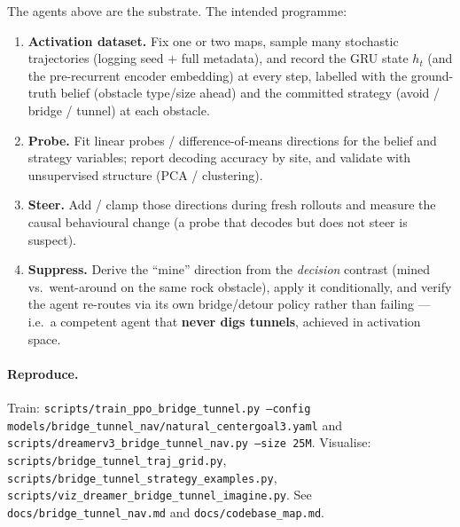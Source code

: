 \documentclass[11pt]{article}
\newcommand{\code}[1]{\texttt{#1}}
\begin{document}
The agents above are the substrate. The intended programme:
\begin{enumerate}[leftmargin=1.4em]
\item \textbf{Activation dataset.} Fix one or two maps, sample many stochastic
trajectories (logging seed + full metadata), and record the GRU state $h_t$ (and
the pre-recurrent encoder embedding) at every step, labelled with the
ground-truth belief (obstacle type/size ahead) and the committed strategy
(avoid / bridge / tunnel) at each obstacle.
\item \textbf{Probe.} Fit linear probes / difference-of-means directions for the
belief and strategy variables; report decoding accuracy by site, and validate with
unsupervised structure (PCA / clustering).
\item \textbf{Steer.} Add / clamp those directions during fresh rollouts and
measure the causal behavioural change (a probe that decodes but does not steer is
suspect).
\item \textbf{Suppress.} Derive the ``mine'' direction from the \emph{decision}
contrast (mined vs.\ went-around on the same rock obstacle), apply it conditionally,
and verify the agent re-routes via its own bridge/detour policy rather than
failing --- i.e.\ a competent agent that \textbf{never digs tunnels}, achieved in
activation space.
\end{enumerate}

\paragraph{Reproduce.} Train: \code{scripts/train\_ppo\_bridge\_tunnel.py --config
models/bridge\_tunnel\_nav/natural\_centergoal3.yaml} and \code{scripts/dreamerv3\_bridge\_tunnel\_nav.py
--size 25M}. Visualise: \code{scripts/bridge\_tunnel\_traj\_grid.py},
\code{scripts/bridge\_tunnel\_strategy\_examples.py}, \code{scripts/viz\_dreamer\_bridge\_tunnel\_imagine.py}.
See \code{docs/bridge\_tunnel\_nav.md} and \code{docs/codebase\_map.md}.
\end{document}
